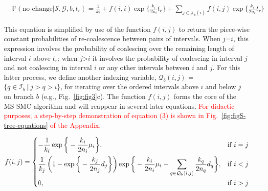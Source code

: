 \documentclass[11pt]{article}
\begin{document}
\begin{equation}
\begin{aligned}
	&\mathbb{P}(\text{no-change} | \mathcal{S},\mathcal{G},b,t_r) = 
	\frac{1}{k_i} + 
	f(i,i) \exp \bigg\{ \frac{k_i}{2n_i} t_r \bigg\} +
	\sum_{j \in \mathcal{J}_b(i)} f(i,j) \exp \bigg\{ \frac{k_i}{2n_i} t_r\bigg\}
\end{aligned}
\end{equation}


\noindent This equation is simplified by use of the function $f(i,j)$
to return the piece-wise constant probabilities of re-coalescence between
pairs of intervals. When $j$=$i$, this expression involves the probability of 
coalescing over the remaining length of interval $i$ above $t_r$; 
when $j$>$i$ it involves the probability of coalescing in interval 
$j$ and not coalescing in interval $i$ or any other intervals 
between $i$ and $j$. For this latter process, we define another
indexing variable, $\mathcal{Q}_b(i,j)$ = $\{q \in \mathcal{I}_b ~|~ j > q > i\}$, 
for iterating over the ordered intervals above $i$ and below $j$ 
on branch $b$ (e.g., Fig.~\ref{fig:fig3}c).
The function $f(i,j)$ forms the core of the MS-SMC algorithm and 
will reappear in several later equations. 
\textcolor{red}{For didactic purposes, a step-by-step demonstration 
of equation (3) is shown in Fig.~\ref{fig:figS-tree-equations} of the Appendix.}

\begin{equation}
\begin{aligned}	
	f(i,j) = 
	\begin{dcases}
		- \frac{1}{k_i} \exp \bigg\{-\frac{k_i}{2n_i}\mu_i \bigg\}, 
		& \text{if } i=j\\
		\frac{1}{k_j} \left(1 - \exp \bigg\{ -\frac{k_j}{2n_j} d_j \bigg\} 
		\right)
		\exp \bigg\{ -\frac{k_i}{2n_i}\mu_i - 
		\sum_{q \in \mathcal{Q}_b(i,j)} \frac{k_q}{2n_q} d_q \bigg \}, 
		& \text{if } i<j\\
		0, 
		& \text{if } i>j\\
	\end{dcases}
\end{aligned}
\end{equation}

\end{document}
